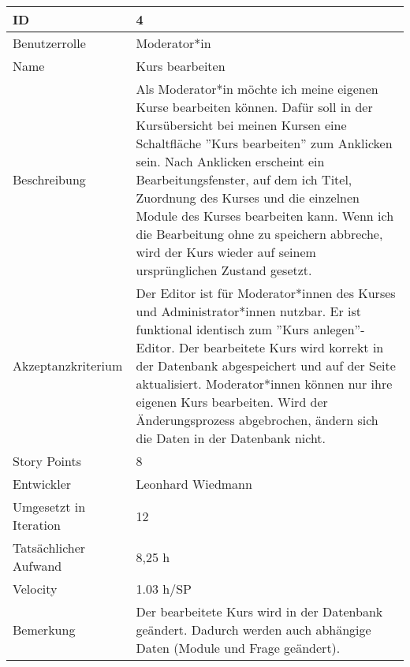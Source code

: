 \begin{tabularx}{\textwidth}{|p{}|X|}
	\hline
	ID & 4\\
	\hline
	Benutzerrolle & Moderator*in\\
	\hline
	Name & Kurs bearbeiten\\
	\hline
	Beschreibung & Als Moderator*in möchte ich meine eigenen Kurse bearbeiten können. Dafür soll in der Kursübersicht bei meinen Kursen eine Schaltfläche ''Kurs bearbeiten'' zum Anklicken sein. Nach Anklicken erscheint ein Bearbeitungsfenster, auf dem ich Titel, Zuordnung des Kurses und die einzelnen Module des Kurses bearbeiten kann. Wenn ich die Bearbeitung ohne zu speichern abbreche, wird der Kurs wieder auf seinem ursprünglichen Zustand gesetzt.\\
	\hline
	Akzeptanzkriterium & Der Editor ist für Moderator*innen des Kurses und Administrator*innen nutzbar. Er ist funktional identisch zum ''Kurs anlegen''-Editor. Der bearbeitete Kurs wird korrekt in der Datenbank abgespeichert und auf der Seite aktualisiert. Moderator*innen können nur ihre eigenen Kurs bearbeiten. Wird der Änderungsprozess abgebrochen, ändern sich die Daten in der Datenbank nicht.\\
	\hline
	Story Points & 8 \\
	\hline
	Entwickler & Leonhard Wiedmann \\
	\hline
	Umgesetzt in Iteration & 12\\
	\hline
	Tatsächlicher Aufwand & 8,25 h \\
	\hline
	Velocity & 1.03 h/SP \\
	\hline
	Bemerkung & Der bearbeitete Kurs wird in der Datenbank geändert. Dadurch werden auch abhängige Daten (Module und Frage geändert).\\
	\hline
\end{tabularx}
\vspace{20pt}
